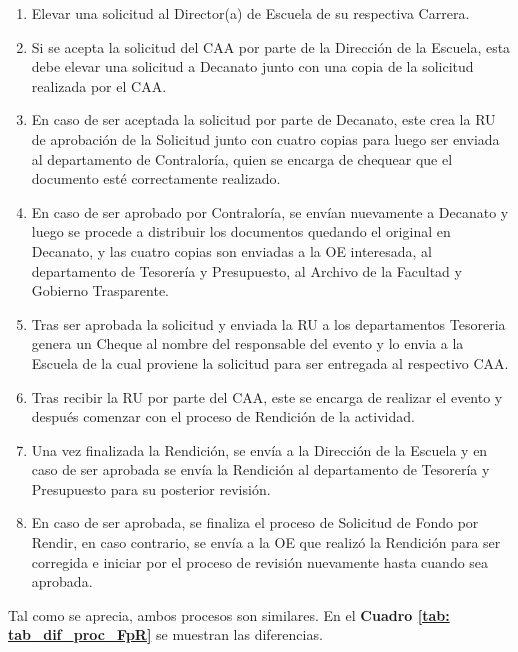 \begin{enumerate}
    \item Elevar una solicitud al Director(a) de Escuela de su respectiva Carrera. 
    \item Si se acepta la solicitud del CAA por parte de la Dirección de la Escuela, esta debe elevar una solicitud a Decanato junto con una copia de la solicitud realizada por el CAA. 
    \item En caso de ser aceptada la solicitud por parte de Decanato, este crea la RU de aprobación de la Solicitud junto con cuatro copias para luego ser enviada al departamento de Contraloría, quien se encarga de chequear que el documento esté correctamente realizado. 
    \item En caso de ser aprobado por Contraloría, se envían nuevamente a Decanato y luego se procede a distribuir los documentos quedando el original en Decanato, y las cuatro copias son enviadas a la OE interesada, al departamento de Tesorería y Presupuesto, al Archivo de la Facultad y Gobierno Trasparente.
    \item Tras ser aprobada la solicitud y enviada la RU a los departamentos Tesoreria genera un Cheque al nombre del responsable del evento y lo envia a la Escuela de la cual proviene la solicitud para ser entregada al respectivo CAA.
    \item Tras recibir la RU por parte del CAA, este se encarga de realizar el evento y después comenzar con el proceso de Rendición de la actividad. 
    \item Una vez finalizada la Rendición, se envía a la Dirección de la Escuela y en caso de ser aprobada se envía la Rendición al departamento de Tesorería y Presupuesto para su posterior revisión.
    \item En caso de ser aprobada, se finaliza el proceso de Solicitud de Fondo por Rendir, en caso contrario, se envía a la OE que realizó la Rendición para ser corregida e iniciar por el proceso de revisión nuevamente hasta cuando sea aprobada.
\end{enumerate}


Tal como se aprecia, ambos procesos son similares. En el \textbf{Cuadro \ref{tab: tab_dif_proc_FpR}} se muestran las diferencias.

